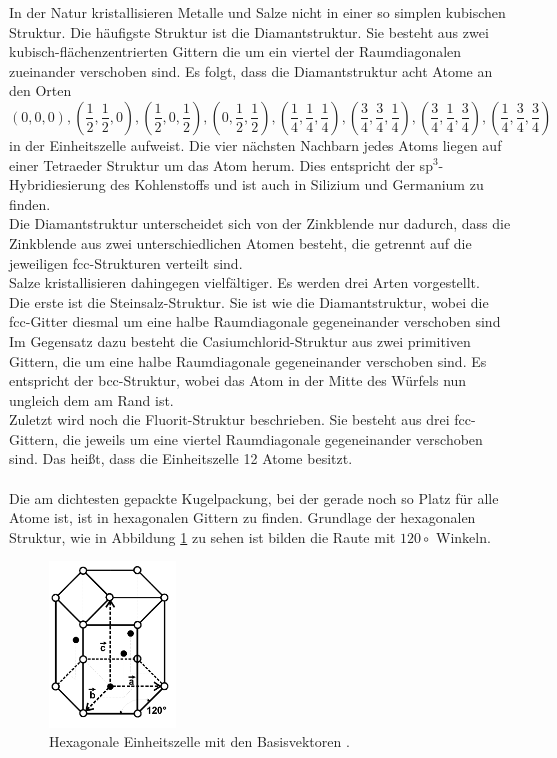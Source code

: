 In der Natur kristallisieren Metalle und Salze nicht in einer so simplen kubischen Struktur. 
Die häufigste Struktur ist die Diamantstruktur. 
Sie besteht aus  zwei kubisch-flächenzentrierten Gittern die um ein viertel der Raumdiagonalen zueinander verschoben sind. 
Es folgt, dass die Diamantstruktur acht Atome an den Orten
\begin{equation}
(0,0,0), \left(\frac{1}{2}, \frac{1}{2}, 0 \right), \left(\frac{1}{2}, 0, \frac{1}{2} \right), \left(0, \frac{1}{2}, \frac{1}{2} \right), \left(\frac{1}{4}, \frac{1}{4}, \frac{1}{4} \right), \left(\frac{3}{4}, \frac{3}{4}, \frac{1}{4} \right), \left(\frac{3}{4}, \frac{1}{4}, \frac{3}{4} \right),  \left(\frac{1}{4}, \frac{3}{4}, \frac{3}{4} \right)
\end{equation}
in der Einheitszelle aufweist.
Die vier nächsten Nachbarn jedes Atoms liegen auf einer Tetraeder Struktur um das Atom herum.
Dies entspricht der sp$^3$-Hybridiesierung des Kohlenstoffs und ist auch in Silizium und Germanium zu finden.\\
Die Diamantstruktur unterscheidet sich von der Zinkblende nur dadurch, dass die Zinkblende aus zwei unterschiedlichen Atomen besteht, die getrennt auf die jeweiligen fcc-Strukturen verteilt sind.\\
Salze kristallisieren dahingegen vielfältiger.
Es werden drei Arten vorgestellt.\\
Die erste ist die Steinsalz-Struktur. 
Sie ist wie die Diamantstruktur, wobei die fcc-Gitter diesmal um eine halbe Raumdiagonale gegeneinander verschoben sind\\
Im Gegensatz dazu besteht die Casiumchlorid-Struktur aus zwei primitiven Gittern, die um eine halbe Raumdiagonale gegeneinander verschoben sind. 
Es entspricht der bcc-Struktur, wobei das Atom in der Mitte des Würfels nun ungleich dem am Rand ist.\\
Zuletzt wird noch die Fluorit-Struktur beschrieben.
Sie besteht aus drei fcc-Gittern, die jeweils um eine viertel Raumdiagonale gegeneinander verschoben sind. 
Das heißt, dass die Einheitszelle 12 Atome besitzt.\\\\
Die am dichtesten gepackte Kugelpackung, bei der gerade noch so Platz für alle Atome ist, ist in hexagonalen Gittern zu finden. 
Grundlage der hexagonalen Struktur, wie in Abbildung \ref{fig:hexagonal} zu sehen ist bilden die Raute mit $120\circ$  Winkeln.
\begin{figure}[h]
	\centering
	\includegraphics[width = 0.3\textwidth]{Abbildungen/hexagonal.png}
	\caption{Hexagonale Einheitszelle mit den Basisvektoren \cite{Anleitung}. }
	\label{fig:hexagonal}
\end{figure} 
